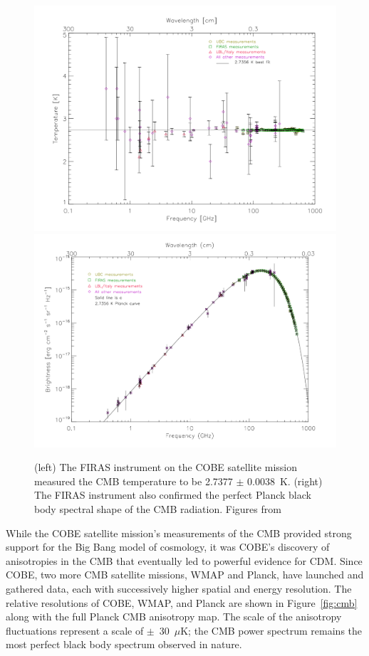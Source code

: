 \begin{figure}[htbp]
\begin{center}
\includegraphics[width=\halffig]{figures/theory/cobe_temp.png}
\includegraphics[width=\halffig]{figures/theory/cobe_spectrum.png}
\caption{(left) The FIRAS instrument on the COBE satellite mission measured the \acs{CMB} temperature to be 2.7377 $\pm$ 0.0038~K. (right) The FIRAS instrument also confirmed the perfect Planck black body spectral shape of the \acs{CMB} radiation. Figures from \cite{Smoot1999} }
\label{fig:cobe}
\end{center}
\end{figure}

While the COBE satellite mission's measurements of the \ac{CMB} provided strong support for the Big Bang model of cosmology, it was COBE's discovery of anisotropies in the \ac{CMB} that eventually led to powerful evidence for \ac{CDM}. Since COBE, two more \ac{CMB} satellite missions, WMAP and Planck, have launched and gathered data, each with successively higher spatial and energy resolution. The relative resolutions of COBE, WMAP, and Planck are shown in Figure~\ref{fig:cmb} along with the full Planck \ac{CMB} anisotropy map. The scale of the anisotropy fluctuations represent a scale of  $\pm$~30~$\mu$K; the \ac{CMB} power spectrum remains the most perfect black body spectrum observed in nature. 

